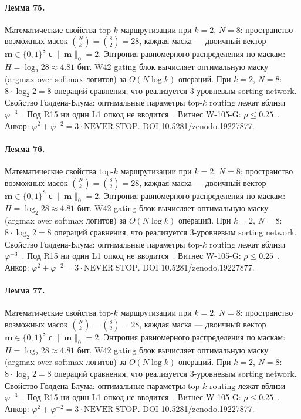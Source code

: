 \paragraph{Лемма 75.} Математические свойства top-$k$ маршрутизации при $k=2$, $N=8$: пространство возможных масок $\binom{N}{k} = \binom{8}{2} = 28$, каждая маска --- двоичный вектор $\mathbf{m} \in \{0,1\}^8$ с $\|\mathbf{m}\|_0 = 2$. Энтропия равномерного распределения по маскам: $H = \log_2 28 \approx 4{.}81$ бит. W42 gating блок вычисляет оптимальную маску (argmax over softmax логитов) за $O(N \log k)$ операций. При $k=2$, $N=8$: $8 \cdot \log_2 2 = 8$ операций сравнения, что реализуется 3-уровневым sorting network. Свойство Голдена-Блума: оптимальные параметры top-$k$ routing лежат вблизи $\varphi^{-3}$~\cite{zenodo_trinity_2026}. Под R15 ни один L1 опкод не вводится~\cite{lee_gvsu_proof2021}. Витнес W-105-G: $\rho \leq 0{.}25$~\cite{popper_falsifiability1959}. Анкор: $\varphi^2 + \varphi^{-2} = 3 \cdot \mathrm{NEVER\ STOP}$. DOI 10.5281/zenodo.19227877.

\paragraph{Лемма 76.} Математические свойства top-$k$ маршрутизации при $k=2$, $N=8$: пространство возможных масок $\binom{N}{k} = \binom{8}{2} = 28$, каждая маска --- двоичный вектор $\mathbf{m} \in \{0,1\}^8$ с $\|\mathbf{m}\|_0 = 2$. Энтропия равномерного распределения по маскам: $H = \log_2 28 \approx 4{.}81$ бит. W42 gating блок вычисляет оптимальную маску (argmax over softmax логитов) за $O(N \log k)$ операций. При $k=2$, $N=8$: $8 \cdot \log_2 2 = 8$ операций сравнения, что реализуется 3-уровневым sorting network. Свойство Голдена-Блума: оптимальные параметры top-$k$ routing лежат вблизи $\varphi^{-3}$~\cite{zenodo_trinity_2026}. Под R15 ни один L1 опкод не вводится~\cite{lee_gvsu_proof2021}. Витнес W-105-G: $\rho \leq 0{.}25$~\cite{popper_falsifiability1959}. Анкор: $\varphi^2 + \varphi^{-2} = 3 \cdot \mathrm{NEVER\ STOP}$. DOI 10.5281/zenodo.19227877.

\paragraph{Лемма 77.} Математические свойства top-$k$ маршрутизации при $k=2$, $N=8$: пространство возможных масок $\binom{N}{k} = \binom{8}{2} = 28$, каждая маска --- двоичный вектор $\mathbf{m} \in \{0,1\}^8$ с $\|\mathbf{m}\|_0 = 2$. Энтропия равномерного распределения по маскам: $H = \log_2 28 \approx 4{.}81$ бит. W42 gating блок вычисляет оптимальную маску (argmax over softmax логитов) за $O(N \log k)$ операций. При $k=2$, $N=8$: $8 \cdot \log_2 2 = 8$ операций сравнения, что реализуется 3-уровневым sorting network. Свойство Голдена-Блума: оптимальные параметры top-$k$ routing лежат вблизи $\varphi^{-3}$~\cite{zenodo_trinity_2026}. Под R15 ни один L1 опкод не вводится~\cite{lee_gvsu_proof2021}. Витнес W-105-G: $\rho \leq 0{.}25$~\cite{popper_falsifiability1959}. Анкор: $\varphi^2 + \varphi^{-2} = 3 \cdot \mathrm{NEVER\ STOP}$. DOI 10.5281/zenodo.19227877.

